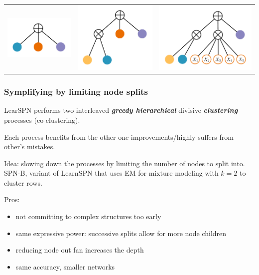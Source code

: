 \documentclass[xcolor={usenames,dvipsnames,svgnames}, compress]{beamer}
\begin{document}
\begin{frame}
\begin{table}[ht]
\begin{tabular}{l l l l}
    \end{tabular}
  \end{table}
  \hfill\
    \begin{table}[ht]
       \begin{tabular}{r r r}
         \includegraphics[width=0.2\linewidth]{figures/learnspn-1}&
                                                                     \includegraphics[width=0.24\linewidth]{figures/learnspn-2}&
                                                                                                                                 \includegraphics[width=0.30\linewidth]{figures/learnspn-3}\\
      \end{tabular}
    \end{table}
\end{frame}

\begin{frame}
  \frametitle{Symplifying by limiting node splits}
  \footnotesize
  \textsf{LearSPN} performs two interleaved \textbf{\emph{greedy
      hierarchical}} divisive \textbf{\emph{clustering}}
  processes (co-clustering).\par\bigskip

  Each process benefits from the other one improvements/highly suffers
  from other's mistakes.\par\bigskip

  Idea: slowing down the processes by limiting the number of
  nodes to split into. \textsf{SPN-B}, variant of \textsf{LearnSPN} that uses EM
  for mixture modeling with
  $k=2$ to cluster rows.\par\bigskip

  Pros:
  \begin{itemize}
  \item not committing to complex structures too early  
  \item same expressive power: successive splits allow for more node children
  \item reducing node out fan increases the depth
  \item same accuracy, smaller networks
  \end{itemize}
  
\end{frame}
\end{document}
